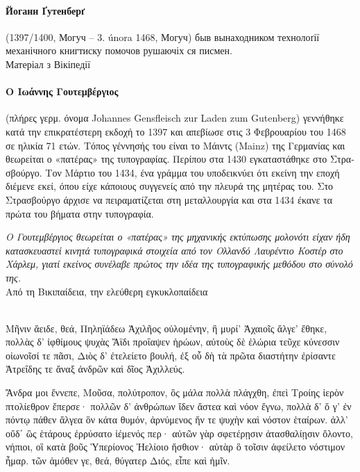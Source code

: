 \documentclass[pagesize,DIV14]{scrartcl}
\begin{document}
\begin{multicols}{2}
\paragraph*{Йоганн Ґутенберґ} (1397/1400, Могуч – 3. února
1468, Могуч) быв вынаходником технолоґії
механічного книгтиску помочов рушаючіх ся писмен.\\
{\scriptsize Матеріал з Вікіпедії}
\begin{greek}
\paragraph*{Ο Ιωάννης Γουτεμβέργιος} (πλήρες γερμ. όνομα Johannes Gensfleisch zur Laden zum Gutenberg) γεννήθηκε κατά την επικρατέστερη εκδοχή το 1397 και απεβίωσε στις 3 Φεβρουαρίου του 1468 σε ηλικία 71 ετών. Τόπος γέννησής του είναι το Μάιντς (Mainz) της Γερμανίας και θεωρείται ο «πατέρας» της τυπογραφίας. Περίπου στα 1430 εγκαταστάθηκε στο Στρασβούργο. Τον Μάρτιο του 1434, ένα γράμμα του υποδεικνύει ότι εκείνη την εποχή διέμενε εκεί, όπου είχε κάποιους συγγενείς από την πλευρά της μητέρας του. Στο Στρασβούργο άρχισε να πειραματίζεται στη μεταλλουργία και στα 1434 έκανε τα πρώτα του βήματα στην τυπογραφία.\par
\textit{Ο Γουτεμβέργιος θεωρείται ο «πατέρας» της μηχανικής εκτύπωσης μολονότι είχαν ήδη κατασκευαστεί κινητά τυπογραφικά στοιχεία από τον Ολλανδό Λαυρέντιο Κοστέρ στο Χάρλεμ, γιατί εκείνος συνέλαβε πρώτος την ιδέα της τυπογραφικής μεθόδου στο σύνολό της.}
\\
{\scriptsize Από τη Βικιπαίδεια, την ελεύθερη εγκυκλοπαίδεια}
\end{greek}\\
    Μῆνιν ἄειδε, θεά, Πηληϊάδεω Ἀχιλῆος
    οὐλομένην, ἣ μυρί' Ἀχαιοῖς ἄλγε' ἔθηκε,
    πολλὰς δ' ἰφθίμους ψυχὰς Ἄϊδι προΐαψεν
    ἡρώων, αὐτοὺς δὲ ἑλώρια τεῦχε κύνεσσιν
    οἰωνοῖσί τε πᾶσι, Διὸς δ' ἐτελείετο βουλή,
    ἐξ οὗ δὴ τὰ πρῶτα διαστήτην ἐρίσαντε
    Ἀτρεΐδης τε ἄναξ ἀνδρῶν καὶ δῖος Ἀχιλλεύς. \par
    
    {
    Ἄνδρα μοι ἔννεπε, Μοῦσα, πολύτροπον, ὃς μάλα πολλὰ
    πλάγχθη, ἐπεὶ Τροίης ἱερὸν πτολίεθρον ἔπερσε·
    πολλῶν δ’ ἀνθρώπων ἴδεν ἄστεα καὶ νόον ἔγνω,
    πολλὰ δ’ ὅ γ’ ἐν πόντῳ πάθεν ἄλγεα ὃν κάτα θυμόν,
    ἀρνύμενος ἥν τε ψυχὴν καὶ νόστον ἑταίρων.
    ἀλλ’ οὔδ΄ ὣς ἑτάρους ἐρρύσατο ἱέμενός περ·
    αὐτῶν γὰρ σφετέρῃσιν ἀτασθαλίῃσιν ὄλοντο,
    νήπιοι, οἳ κατὰ βοῦς Ὑπερίονος Ἠελίοιο
    ἤσθιον· αὐτὰρ ὃ τοῖσιν ἀφείλετο νόστιμον ἦμαρ.
    τῶν ἁμόθεν γε, θεά, θύγατερ Διός, εἶπε καὶ ἡμῖν. \par

}


\end{multicols}
\clearpage
\end{document}
